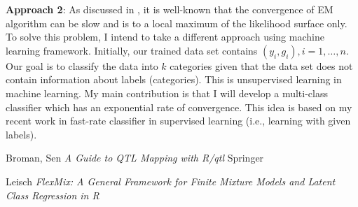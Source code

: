\documentclass{article}
\begin{document}
\textbf{Approach 2}: As discussed in \cite{Leisch}, it is well-known that the convergence of EM algorithm  can be slow and is to a local maximum of the likelihood surface only.  To solve this problem, I intend to take a different approach using machine learning framework. Initially, our  trained data set contains $(y_i,g_i), i=1,\ldots,n.$ Our goal is to classify the data into $k$ categories given that the data set does not contain information about labels (categories). This is unsupervised learning in machine learning. My main contribution is that I will develop a multi-class classifier which has an exponential rate of convergence. This idea is based on my recent work in fast-rate classifier in supervised learning (i.e., learning with given labels). 
\begin{thebibliography}{99}
 		Broman, Sen
 		\emph{A Guide to QTL Mapping with R/qtl} Springer
	
	     Leisch
		\emph{FlexMix: A General Framework for Finite Mixture Models and Latent Class Regression in R}

\end{thebibliography}
\end{document}
